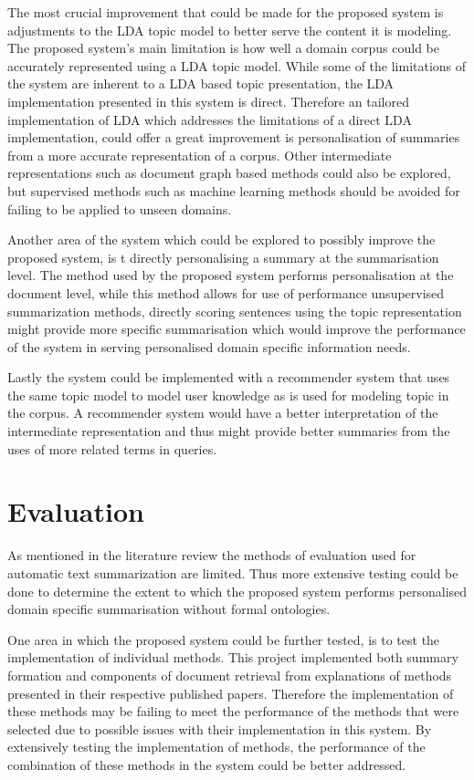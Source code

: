The most crucial improvement that could be made for the proposed system is adjustments to the LDA topic model to better serve the content it is modeling.  The proposed system's main limitation is how well a domain corpus could be accurately represented using a LDA topic model. While some of the limitations of the system are inherent to a LDA based topic presentation, the LDA implementation presented in this system is direct. Therefore an tailored implementation of LDA which addresses the limitations of a direct LDA implementation, could offer a great improvement is personalisation of summaries from a more accurate representation of a corpus. Other intermediate representations such as document graph based methods could also be explored, but supervised methods such as machine learning methods should be avoided for failing to be applied to unseen domains.

Another area of the system which could be explored to possibly improve the proposed system, is t directly personalising a summary at the summarisation level. The method used by the proposed system performs personalisation at the document level, while this method allows for use of performance unsupervised summarization methods, directly scoring sentences using the topic representation might provide more specific summarisation which would improve the performance of the system in serving personalised domain specific information needs.

Lastly the system could be implemented with a recommender system that uses the same topic model to model user knowledge as is used for modeling topic in the corpus. A recommender system would have a better interpretation of the intermediate representation and thus might provide better summaries from the uses of more related terms in queries. 

\section{Evaluation}
As mentioned in the literature review the methods of evaluation used for automatic text summarization are limited. Thus more extensive testing could be done to determine the extent to which the proposed system performs personalised domain specific summarisation without formal ontologies. 

One area in which the proposed system could be further tested, is to test the implementation of individual methods. This project implemented both summary formation and components of document retrieval from explanations of methods presented in their respective published papers. Therefore the implementation of these methods may be failing to meet the performance of the methods that were selected due to possible issues with their implementation in this system. By extensively testing the implementation of methods, the performance of the combination of these methods in the system could be better addressed.

